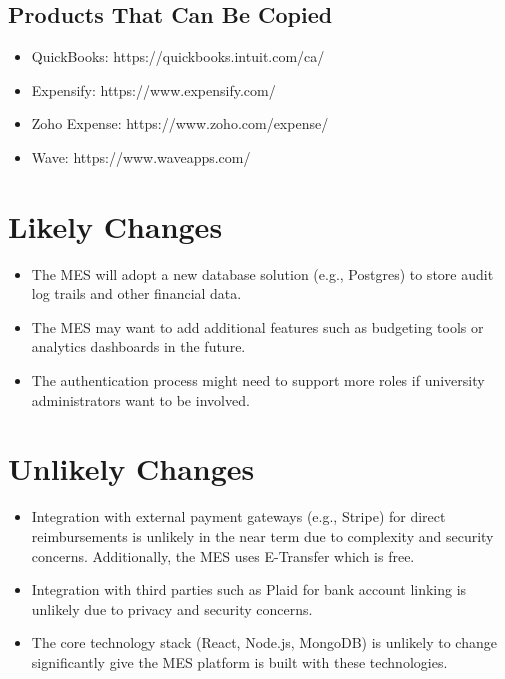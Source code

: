 \documentclass[12pt]{article}
\begin{document}
  \subsection{Products That Can Be Copied}
    \begin{itemize}
      \item QuickBooks: https://quickbooks.intuit.com/ca/
      \item Expensify: https://www.expensify.com/
      \item Zoho Expense: https://www.zoho.com/expense/
      \item Wave: https://www.waveapps.com/
    \end{itemize}

\section{Likely Changes}
  \begin{itemize}
    \item The MES will adopt a new database solution (e.g., Postgres) to store audit log trails and other financial data.
    \item The MES may want to add additional features such as budgeting tools or analytics dashboards in the future.
    \item The authentication process might need to support more roles if university administrators want to be involved.
  \end{itemize}    

\section{Unlikely Changes}    
  \begin{itemize}
    \item Integration with external payment gateways (e.g., Stripe) for direct reimbursements is unlikely in the near term due to complexity and security concerns. Additionally, the MES uses E-Transfer which is free.
    \item Integration with third parties such as Plaid for bank account linking is unlikely due to privacy and security concerns.
    \item The core technology stack (React, Node.js, MongoDB) is unlikely to change significantly give the MES platform is built with these technologies.
  \end{itemize}
\end{document}
